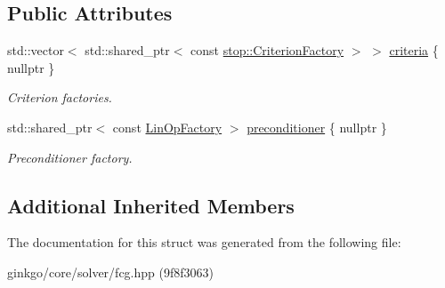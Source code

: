 \subsection*{Public Attributes}
\begin{DoxyCompactItemize}
\item 
\mbox{\label{structgko_1_1solver_1_1Fcg_1_1parameters__type_a4d322d51e9c1908b97a868746c191683}} 
std\+::vector$<$ std\+::shared\+\_\+ptr$<$ const \hyperlink{group__stop_gab12a51109c50b35ec36dc5a393d6a9a0}{stop\+::\+Criterion\+Factory} $>$ $>$ \hyperlink{structgko_1_1solver_1_1Fcg_1_1parameters__type_a4d322d51e9c1908b97a868746c191683}{criteria} \{ nullptr \}
\begin{DoxyCompactList}\small\item\em Criterion factories. \end{DoxyCompactList}\item 
\mbox{\label{structgko_1_1solver_1_1Fcg_1_1parameters__type_afbdb7787925ef4294b12fe6851cfafd4}} 
std\+::shared\+\_\+ptr$<$ const \hyperlink{classgko_1_1LinOpFactory}{Lin\+Op\+Factory} $>$ \hyperlink{structgko_1_1solver_1_1Fcg_1_1parameters__type_afbdb7787925ef4294b12fe6851cfafd4}{preconditioner} \{ nullptr \}
\begin{DoxyCompactList}\small\item\em Preconditioner factory. \end{DoxyCompactList}\end{DoxyCompactItemize}
\subsection*{Additional Inherited Members}


The documentation for this struct was generated from the following file\+:\begin{DoxyCompactItemize}
\item 
ginkgo/core/solver/fcg.\+hpp (9f8f3063)\end{DoxyCompactItemize}
